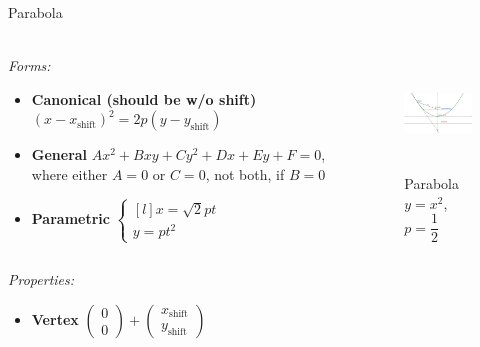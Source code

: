 \documentclass[aspectratio=169]{beamer}
\newcommand{\shf}{\text{shift}}
\begin{document}
\begin{frame}[t]{Parabola}
    \framesubtitle{}
        \scriptsize
        \vspace{-0.4cm}
    \begin{columns}[T,onlytextwidth]
        \begin{column}{0.59\textwidth}
            \textit{Forms:} \\
    \begin{itemize}
        \item \textbf{Canonical (should be w/o shift)} $(x-x_{\shf})^2=2p(y-y_{\shf})$
        \item \textbf{General} $Ax^2+Bxy+Cy^2+Dx+Ey+F=0$, where either $A=0$ or $C=0$, not both, if $B=0$
        \item \textbf{Parametric} $\left\{\begin{matrix*}[l] x = \sqrt{2}pt\\ y = pt^2\end{matrix*}\right.$
    \end{itemize}
        \end{column}
        \begin{column}{0.39\textwidth}
            \begin{figure}[H]
                \centering\includegraphics[height=3cm,width=1\textwidth,keepaspectratio]{Parabola.png}
                \vspace{-0.5cm}
                \caption*{\scriptsize Parabola $y=x^2$, $p=\dfrac{1}{2}$}
                \label{fig:Parabola.png}
            \end{figure}
        \end{column}
    \end{columns}
    \vspace{-0.6cm}
    \textit{Properties:}
    \begin{multicols}{3}
        \begin{itemize}
            \item \textbf{Vertex} $\begin{pmatrix} 0\\0 \end{pmatrix} + \begin{pmatrix} x_{\shf}\\y_{\shf} \end{pmatrix}$

\end{itemize}
\end{multicols}
\end{frame}
\end{document}
